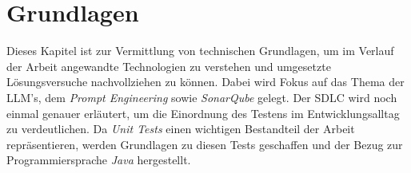 
\chapter{Grundlagen}\label{chap:basics}
Dieses Kapitel ist zur Vermittlung von technischen Grundlagen, um im Verlauf der Arbeit angewandte Technologien zu verstehen und umgesetzte Lösungsversuche nachvollziehen zu können. Dabei wird Fokus auf das Thema der LLM's, dem \textit{Prompt Engineering} sowie \textit{SonarQube} gelegt. Der SDLC wird noch einmal genauer erläutert, um die Einordnung des Testens im Entwicklungsalltag zu verdeutlichen. Da \textit{Unit Tests} einen wichtigen Bestandteil der Arbeit repräsentieren, werden Grundlagen zu diesen Tests geschaffen und der Bezug zur Programmiersprache \textit{Java} hergestellt.


